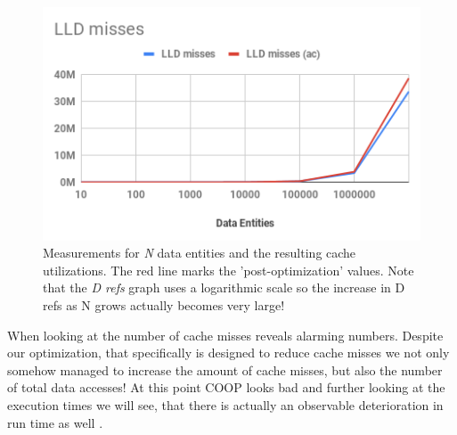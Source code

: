 \begin{figure}[ht]
\begin{minipage}[b]{0.333\linewidth}
	\end{minipage}
\hspace{-0.3cm}
	\begin{minipage}[b]{0.333\linewidth}
		\centering
		\includegraphics[width=\textwidth,height=\textwidth]{PICs/test_file_lld_misses}
	\end{minipage}
\vspace{-0.5cm}
\caption{Measurements for \textit{N} data entities and the resulting cache utilizations. The red line marks the 'post-optimization' values. Note that the \textit{D refs} graph uses a logarithmic scale so the increase in D refs as N grows actually becomes very large!}
\label{test_file_is_it_bad}
\end{figure}
When looking at the number of cache misses  reveals alarming numbers. Despite our optimization, that specifically is designed to reduce cache misses we not only somehow managed to increase the amount of cache misses, but also the number of total data accesses! At this point COOP looks bad and further looking at the execution times we will see, that there is actually an observable deterioration in run time as well .
